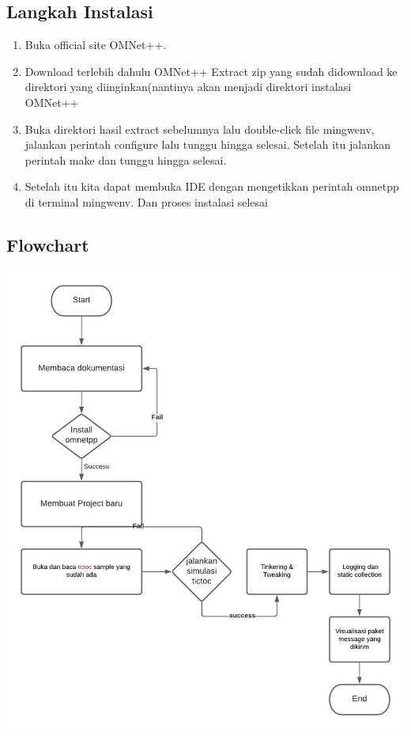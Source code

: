\documentclass[conference]{IEEEtran}
\begin{document}
\subsection{Langkah Instalasi}
\begin{enumerate}
	\item Buka official site OMNet++.
	\item Download terlebih dahulu OMNet++ 
	Extract zip yang sudah didownload ke direktori yang diinginkan(nantinya akan menjadi direktori instalasi OMNet++
	\item Buka direktori hasil extract sebelumnya lalu double-click file mingwenv, jalankan perintah configure lalu tunggu hingga selesai. Setelah itu jalankan perintah make dan tunggu hingga selesai.
	\item Setelah itu kita dapat membuka IDE dengan mengetikkan perintah omnetpp di terminal mingwenv. Dan proses instalasi selesai
\end{enumerate}


\subsection{Flowchart}
\includegraphics[scale=0.18]{images/flowchart.png}
\end{document}
